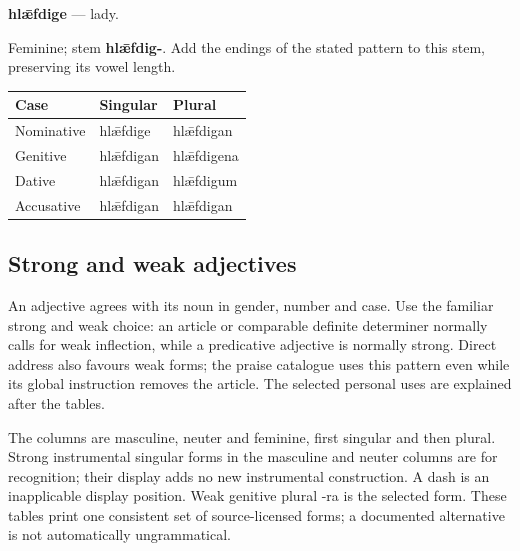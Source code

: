 \par\begin{minipage}{\linewidth}\raggedright
\textbf{hlǣfdige} — lady.

Feminine; stem \textbf{hlǣfdig-}. Add the endings of the stated pattern to this stem, preserving its vowel length.

\par\begingroup
\fontsize{10.5}{13.2}\selectfont
\setlength{\LTleft}{0pt}\setlength{\LTright}{\fill}
\noindent
\begin{tabular}{@{}>{\raggedright\arraybackslash}p{39.46mm}>{\raggedright\arraybackslash}p{39.46mm}>{\raggedright\arraybackslash}p{39.46mm}@{}}
\toprule
\textbf{Case} & \textbf{Singular} & \textbf{Plural} \\
\midrule
Nominative & hlǣfdige & hlǣfdigan \\
Genitive & hlǣfdigan & hlǣfdigena \\
Dative & hlǣfdigan & hlǣfdigum \\
Accusative & hlǣfdigan & hlǣfdigan \\
\bottomrule
\end{tabular}
\par\endgroup

\end{minipage}\par
{}
\subsection*{Strong and weak adjectives}

An adjective agrees with its noun in gender, number and case. Use the familiar strong and weak choice: an article or comparable definite determiner normally calls for weak inflection, while a predicative adjective is normally strong. Direct address also favours weak forms; the praise catalogue uses this pattern even while its global instruction removes the article. The selected personal uses are explained after the tables.

The columns are masculine, neuter and feminine, first singular and then plural. Strong instrumental singular forms in the masculine and neuter columns are for recognition; their display adds no new instrumental construction. A dash is an inapplicable display position. Weak genitive plural -ra is the selected form. These tables print one consistent set of source-licensed forms; a documented alternative is not automatically ungrammatical.

